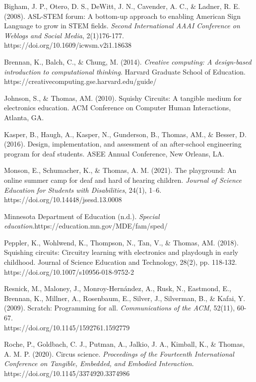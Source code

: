 \documentclass[11.5pt]{sig-alternate}
\begin{document}
Bigham, J. P., Otero, D. S., DeWitt, J. N., Cavender, A. C., \& Ladner, R. E. (2008). ASL-STEM forum: A bottom-up approach to enabling American Sign Language to grow in STEM fields. \textit{Second International AAAI Conference on Weblogs and Social Media}, 2(1)176-177. \\https://doi.org/10.1609/icwsm.v2i1.18638

Brennan, K., Balch, C., \& Chung, M. (2014). \textit{ Creative computing: A design-based introduction to computational thinking}. Harvard Graduate School of Education. \\https://creativecomputing.gse.harvard.edu/guide/

Johnson, S., \& Thomas, AM. (2010). Squishy Circuits: A tangible medium for electronics education. ACM Conference on Computer Human Interactions, Atlanta, GA.

Kasper, B., Haugh, A., Kasper, N., Gunderson, B., Thomas, AM., \& Besser, D. (2016). Design, implementation, and assessment of an after-school engineering program for deaf students. ASEE Annual Conference, New Orleans, LA.

Monson, E., Schumacher, K., \& Thomas, A. M. (2021). The playground: An online summer camp for deaf and hard of hearing children. \textit{Journal of Science Education for Students with Disabilities}, 24(1), 1–6. \\https://doi.org/10.14448/jsesd.13.0008

Minnesota Department of Education (n.d.). \textit{Special education}.https://education.mn.gov/MDE/fam/sped/

Peppler, K., Wohlwend, K., Thompson, N., Tan, V., \& Thomas, AM. (2018). Squishing circuits: Circuitry learning with electronics and playdough in early childhood. Journal of Science Education and Technology, 28(2), pp. 118-132. https://doi.org/10.1007/s10956-018-9752-2

Resnick, M., Maloney, J., Monroy-Hernández, A., Rusk, N., Eastmond, E., Brennan, K., Millner, A., Rosenbaum, E., Silver, J., Silverman, B., \& Kafai, Y. (2009). Scratch: Programming for all. \textit{Communications of the ACM}, 52(11), 60-67. \\https://doi.org/10.1145/1592761.1592779

Roche, P., Goldbach, C. J., Putman, A., Jalkio, J. A., Kimball, K., \& Thomas, A. M. P. (2020). Circus science. \textit{Proceedings of the Fourteenth International Conference on Tangible, Embedded, and Embodied Interaction}. \\https://doi.org/10.1145/3374920.3374986
\end{document}

